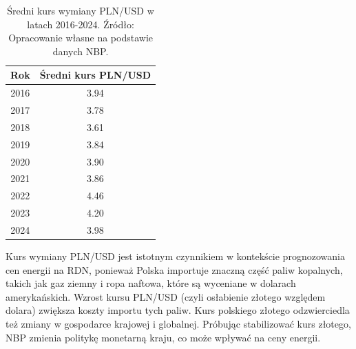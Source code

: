 \begin{table}[H]
    \centering
    \begin{tabular}{|c|c|}
    \hline
    \textbf{Rok} & \textbf{Średni kurs PLN/USD} \\ \hline
    2016 & 3.94 \\ \hline
    2017 & 3.78 \\ \hline
    2018 & 3.61 \\ \hline
    2019 & 3.84 \\ \hline
    2020 & 3.90 \\ \hline
    2021 & 3.86 \\ \hline
    2022 & 4.46 \\ \hline
    2023 & 4.20 \\ \hline
    2024 & 3.98 \\ \hline
    \end{tabular}
    \caption{Średni kurs wymiany PLN/USD w latach 2016-2024. Źródło: Opracowanie własne na podstawie danych NBP.}
    \label{tab:pln-usd-exchange-rate}
\end{table}

Kurs wymiany PLN/USD jest istotnym czynnikiem w kontekście prognozowania cen energii na RDN, ponieważ Polska importuje znaczną część paliw kopalnych, takich jak gaz ziemny i ropa naftowa, które są wyceniane w dolarach amerykańskich. Wzrost kursu PLN/USD (czyli osłabienie złotego względem dolara) zwiększa koszty importu tych paliw. Kurs polskiego złotego odzwierciedla też zmiany w gospodarce krajowej i globalnej. Próbując stabilizować kurs złotego, NBP zmienia politykę monetarną kraju, co może wpływać na ceny energii.